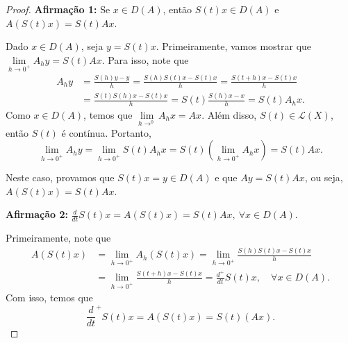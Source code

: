 \begin{proof}\noindent


\noindent\textbf{Afirmação 1:} Se $x\in D(A)$, então $S(t)x\in D(A)$ e $A(S(t)x)=S(t)Ax$.

Dado $x\in D(A)$, seja $y=S(t)x$. Primeiramente, vamos mostrar que
$\lim\limits_{h\to 0^+} A_hy=S(t)Ax$. Para isso, note que
\begin{align*}
    A_hy&=\frac{S(h)y-y}{h}=\frac{S(h)S(t)x-S(t)x}{h}=\frac{S(t+h)x-S(t)x}{h}\\
    &=\frac{S(t)S(h)x-S(t)x}{h}=S(t)\frac{S(h)x-x}{h}=S(t)A_hx.
\end{align*}
Como $x\in D(A)$, temos que $\lim\limits_{h\to^0}A_hx=Ax$. Além disso, $S(t)\in \mathcal{L}(X)$, então $S(t)$ é contínua. Portanto, 
\[
\lim\limits_{h\to 0^+} A_hy=\lim\limits_{h\to 0^+} S(t)A_hx
=S(t)\left(\lim\limits_{h\to 0^+} A_hx\right)=S(t)Ax.
\]

Neste caso, provamos que $S(t)x=y\in D(A)$ e que $Ay=S(t)Ax$, ou seja, $A(S(t)x)=S(t)Ax$.

\noindent\textbf{Afirmação 2:} $\frac{d}{dt}S(t)x=A(S(t)x)=S(t)Ax,\ \forall x\in D(A).$

Primeiramente, note que
\begin{equation*}
\begin{split}
    A(S(t)x)& =\lim\limits_{h\to 0^+} A_h(S(t)x) =\lim_{h \to 0^+} \frac{S(h)S(t)x - S(t)x}{h}\\
    &= \lim_{h \to 0^+} \frac{S(t+h)x - S(t)x}{h} = \frac{d^+}{dt} S(t)x, \quad \forall x \in D(A).
\end{split}
\end{equation*}
Com isso, temos que 
    \begin{equation}\label{d+}
\frac{d}{dt}^+ S(t)x = A(S(t)x) = S(t)(Ax).    
\end{equation}


\end{proof}
